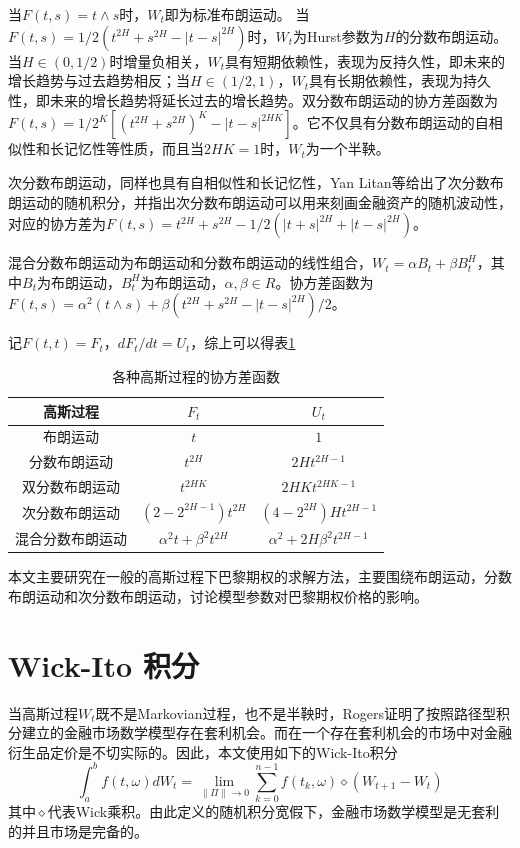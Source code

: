 \documentclass{ctexart} %
\begin{document}
当$F(t,s)=t\wedge s$时，$W_t$即为标准布朗运动。 当$F(t,s)=1/2(t^{2H}+s^{2H}-|t-s|^{2H})$时，$W_t$为Hurst参数为$H$的分数布朗运动。当$H\in(0,1/2)$时增量负相关，$W_t$具有短期依赖性，表现为反持久性，即未来的增长趋势与过去趋势相反；当$H\in(1/2,1)$，$W_t$具有长期依赖性，表现为持久性，即未来的增长趋势将延长过去的增长趋势。双分数布朗运动的协方差函数为$F(t,s)=1/2^K[(t^{2H}+s^{2H})^K-|t-s|^{2HK}]$。它不仅具有分数布朗运动的自相似性和长记忆性等性质，而且当$2HK=1$时，$W_t$为一个半鞅。

次分数布朗运动，同样也具有自相似性和长记忆性，Yan Litan等给出了次分数布朗运动的随机积分，并指出次分数布朗运动可以用来刻画金融资产的随机波动性，对应的协方差为$F(t,s)=t^{2H}+s^{2H}-1/2(|t+s|^{2H}+|t-s|^{2H})$。

混合分数布朗运动为布朗运动和分数布朗运动的线性组合，$W_t=\alpha B_t+\beta B_t^H$，其中$B_t$为布朗运动，$B_t^H$为布朗运动，$\alpha,\beta \in R$。协方差函数为$F(t,s)=\alpha^2(t\wedge s)+\beta(t^{2H}+s^{2H}-|t-s|^{2H})/2$。

记$F(t,t)=F_t$，$dF_t/dt=U_t$，综上可以得表\ref{tabl1}
\begin{table}[htbp]
\centering
\caption{各种高斯过程的协方差函数}
\label{tabl1}
\begin{tabular}{ccc}
\hline
高斯过程& $F_t$ & $U_t$ \\
\hline
布朗运动 & $t$ & $1$ \\
分数布朗运动 & $t^{2H}$ & $2Ht^{2H-1}$ \\
双分数布朗运动 & $t^{2HK}$ & $2HKt^{2HK-1}$ \\
次分数布朗运动 & $(2-2^{2H-1})t^{2H}$ & $(4-2^{2H})Ht^{2H-1}$ \\
混合分数布朗运动 & $\alpha^2t+\beta^2t^{2H}$ & $\alpha^2+2H\beta^2t^{2H-1}$ \\
\hline
\end{tabular}
\end{table}

本文主要研究在一般的高斯过程下巴黎期权的求解方法，主要围绕布朗运动，分数布朗运动和次分数布朗运动，讨论模型参数对巴黎期权价格的影响。


\section{Wick-Ito 积分}
当高斯过程$W_t$既不是Markovian过程，也不是半鞅时，Rogers证明了按照路径型积分建立的金融市场数学模型存在套利机会。而在一个存在套利机会的市场中对金融衍生品定价是不切实际的。因此，本文使用如下的Wick-Ito积分
\begin{equation}
\int_a^bf(t,\omega)dW_t=\lim_{\| \Pi\| \rightarrow0}\sum^{n-1}_{k=0}f(t_k,\omega)\diamond (W_{t+1}-W_t)
\end{equation}
其中$\diamond$代表Wick乘积。由此定义的随机积分宽假下，金融市场数学模型是无套利的并且市场是完备的。
\end{document}
